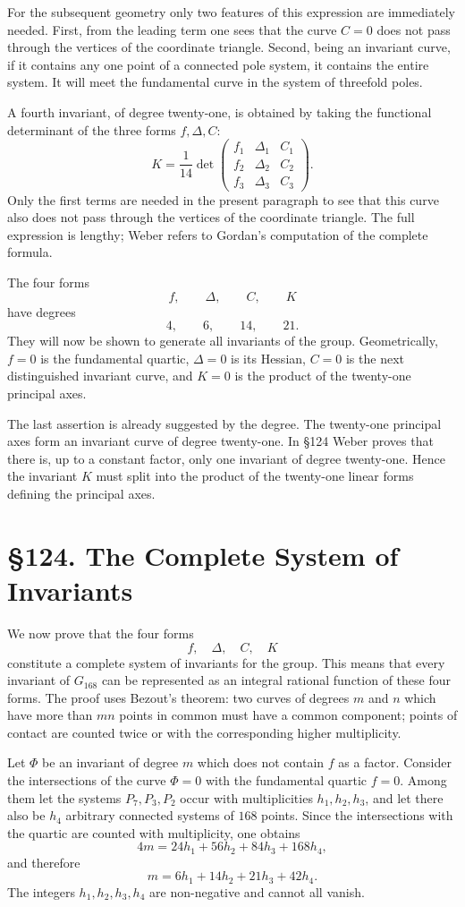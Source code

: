 \documentclass[12pt,a4paper]{article}
\newcommand{\webersection}[2]{\clearpage\section*{\S #1. #2}\addcontentsline{toc}{section}{\S #1. #2}}
\begin{document}
For the subsequent geometry only two features of this expression are immediately needed.  First, from the leading term one sees that the curve \(C=0\) does not pass through the vertices of the coordinate triangle.  Second, being an invariant curve, if it contains any one point of a connected pole system, it contains the entire system.  It will meet the fundamental curve in the system of threefold poles.

A fourth invariant, of degree twenty-one, is obtained by taking the functional determinant of the three forms \(f,\Delta,C\):
\[
 K=\frac{1}{14}
 \det
 \begin{pmatrix}
 f_1&\Delta_1&C_1\\
 f_2&\Delta_2&C_2\\
 f_3&\Delta_3&C_3
 \end{pmatrix}.
\]
Only the first terms are needed in the present paragraph to see that this curve also does not pass through the vertices of the coordinate triangle.  The full expression is lengthy; Weber refers to Gordan's computation of the complete formula.

The four forms
\[
 f,
\qquad \Delta,
\qquad C,
\qquad K
\]
have degrees
\[
4,
\qquad 6,
\qquad 14,
\qquad 21.
\]
They will now be shown to generate all invariants of the group.  Geometrically, \(f=0\) is the fundamental quartic, \(\Delta=0\) is its Hessian, \(C=0\) is the next distinguished invariant curve, and \(K=0\) is the product of the twenty-one principal axes.

The last assertion is already suggested by the degree.  The twenty-one principal axes form an invariant curve of degree twenty-one.  In \S 124 Weber proves that there is, up to a constant factor, only one invariant of degree twenty-one.  Hence the invariant \(K\) must split into the product of the twenty-one linear forms defining the principal axes.

\webersection{124}{The Complete System of Invariants}

We now prove that the four forms
\[
 f,
\quad \Delta,
\quad C,
\quad K
\]
constitute a complete system of invariants for the group.  This means that every invariant of \(G_{168}\) can be represented as an integral rational function of these four forms.  The proof uses Bezout's theorem: two curves of degrees \(m\) and \(n\) which have more than \(mn\) points in common must have a common component; points of contact are counted twice or with the corresponding higher multiplicity.

Let \(\Phi\) be an invariant of degree \(m\) which does not contain \(f\) as a factor.  Consider the intersections of the curve \(\Phi=0\) with the fundamental quartic \(f=0\).  Among them let the systems \(P_7,P_3,P_2\) occur with multiplicities \(h_1,h_2,h_3\), and let there also be \(h_4\) arbitrary connected systems of \(168\) points.  Since the intersections with the quartic are counted with multiplicity, one obtains
\[
4m=24h_1+56h_2+84h_3+168h_4,
\]
and therefore
\[
 m=6h_1+14h_2+21h_3+42h_4. \tag{1}
\]
The integers \(h_1,h_2,h_3,h_4\) are non-negative and cannot all vanish.
\end{document}
